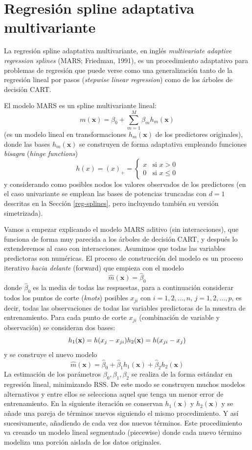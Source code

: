 \documentclass[
]{book}
\theoremstyle{break}
\theoremstyle{definition}
\theoremstyle{definition}
\theoremstyle{definition}
\theoremstyle{definition}
\theoremstyle{remark}
\begin{document}
\hypertarget{mars}{%
\section{Regresión spline adaptativa multivariante}\label{mars}}

La regresión spline adaptativa multivariante, en inglés \emph{multivariate adaptive regression splines} (MARS; Friedman, 1991), es un procedimiento adaptativo para problemas de regresión que puede verse como una generalización tanto de la regresión lineal por pasos (\emph{stepwise linear regression}) como de los árboles de decisión CART.

El modelo MARS es un spline multivariante lineal:\\
\[m(\mathbf{x}) = \beta_0 + \sum_{m=1}^M \beta_m h_m(\mathbf{x})\]
(es un modelo lineal en transformaciones \(h_m(\mathbf{x})\) de los predictores originales), donde las bases \(h_m(\mathbf{x})\) se construyen de forma adaptativa empleando funciones \emph{bisagra} (\emph{hinge functions})
\[ h(x) = (x)_+ = \left\{ \begin{array}{ll}
  x & \mbox{si } x > 0 \\
  0 & \mbox{si } x \leq 0
  \end{array}
  \right.\]
y considerando como posibles nodos los valores observados de los predictores
(en el caso univariante se emplean las bases de potencias truncadas con \(d=1\) descritas en la Sección \ref{reg-splines}, pero incluyendo también su versión simetrizada).

Vamos a empezar explicando el modelo MARS aditivo (sin interacciones), que funciona de forma muy parecida a los árboles de decisión CART, y después lo extenderemos al caso con interacciones.
Asumimos que todas las variables predictoras son numéricas. El proceso de construcción del modelo es un proceso iterativo \emph{hacia delante} (forward) que empieza con el modelo
\[\hat m(\mathbf{x}) = \hat \beta_0 \]
donde \(\hat \beta_0\) es la media de todas las respuestas, para a continuación considerar todos los puntos de corte (\emph{knots}) posibles \(x_{ji}\) con \(i = 1, 2, \ldots, n\), \(j = 1, 2, \ldots, p\), es decir, todas las observaciones de todas las variables predictoras de la muestra de entrenamiento.
Para cada punto de corte \(x_{ji}\) (combinación de variable y observación) se consideran dos bases:
\[h_1(\mathbf{x}) = h(x_j - x_{ji}) \\
h_2(\mathbf{x}) = h(x_{ji} - x_j)\]
y se construye el nuevo modelo
\[\hat m(\mathbf{x}) = \hat \beta_0 + \hat \beta_1 h_1(\mathbf{x}) + \hat \beta_2 h_2(\mathbf{x})\]
La estimación de los parámetros \(\beta_0, \beta_1, \beta_2\) se realiza de la forma estándar en regresión lineal, minimizando \(\mbox{RSS}\). De este modo se construyen muchos modelos alternativos y entre ellos se selecciona aquel que tenga un menor error de entrenamiento. En la siguiente iteración se conservan \(h_1(\mathbf{x})\) y \(h_2(\mathbf{x})\) y se añade una pareja de términos nuevos siguiendo el mismo procedimiento. Y así sucesivamente, añadiendo de cada vez dos nuevos términos. Este procedimiento va creando un modelo lineal segmentado (piecewise) donde cada nuevo término modeliza una porción aislada de los datos originales.
\end{document}
